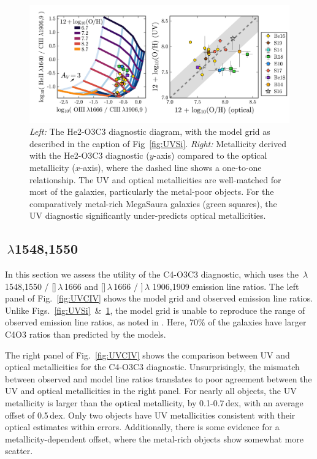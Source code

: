 \documentclass[preprint2]{aastex62}
\newcommand{\oiii}{[\ion{O}{3}]}
\newcommand{\civ}{\ion{C}{4}}
\newcommand{\ciii}{\ion{C}{3}]}
\newcommand{\mage}{{\sc Meg}a{\sc S}a{\sc ura}\xspace}
\begin{document}
\begin{figure}
  \begin{center}
    \includegraphics[width=\linewidth]{figs/f4.png}
    \caption{\emph{Left:} The He2-O3C3 diagnostic diagram, with the model grid as described in the caption of Fig~\ref{fig:UVSi}. \emph{Right:} Metallicity derived with the He2-O3C3 diagnostic ($y$-axis) compared to the optical metallicity ($x$-axis), where the dashed line shows a one-to-one relationship. The UV and optical metallicities are well-matched for most of the galaxies, particularly the metal-poor objects. For the comparatively metal-rich \mage galaxies (green squares), the UV diagnostic significantly under-predicts optical metallicities.}
    \label{fig:UVHe}
  \end{center}
\end{figure}

\subsection{\civ$\,\lambda$1548,1550}\label{sec:ZZ:CIV}

In this section we assess the utility of the C4-O3C3 diagnostic, which uses the \civ$\,\lambda$ 1548,1550 / \oiii $\,\lambda$\,1666 and \oiii $\,\lambda$\,1666 / \ciii $\,\lambda$ 1906,1909 emission line ratios. The left panel of Fig.~\ref{fig:UVCIV} shows the model grid and observed emission line ratios. Unlike Figs.~\ref{fig:UVSi}~\&~\ref{fig:UVHe}, the model grid is unable to reproduce the range of observed emission line ratios, as noted in . Here, 70\% of the galaxies have larger C4O3 ratios than predicted by the models.

The right panel of Fig.~\ref{fig:UVCIV} shows the comparison between UV and optical metallicities for the C4-O3C3 diagnostic. Unsurprisingly, the mismatch between observed and model line ratios translates to poor agreement between the UV and optical metallicities in the right panel. For nearly all objects, the UV metallicity is larger than the optical metallicity, by 0.1-0.7\,dex, with an average offset of 0.5\,dex. Only two objects have UV metallicities consistent with their optical estimates within errors. Additionally, there is some evidence for a metallicity-dependent offset, where the metal-rich objects show somewhat more scatter.
\end{document}
